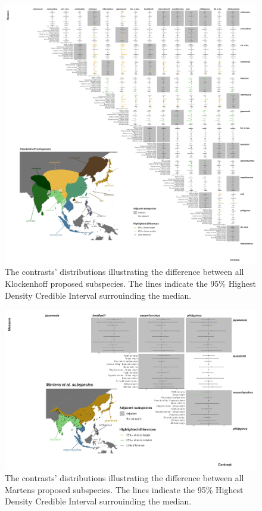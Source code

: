 \documentclass[10pt,a4paper]{article}
\begin{document}
\begin{figure}
\includegraphics[width=0.9\linewidth]{../Figures/klockSpecies_HDCI_contrasts} \caption{The contrasts' distributions illustrating the difference between all Klockenhoff proposed subspecies. The lines indicate the 95\% Highest Density Credible Interval surrouinding the median.}\label{fig:klockContrasts}
\end{figure}

\begin{figure}
\includegraphics[width=0.9\linewidth]{../Figures/martSpecies_HDCI_contrasts} \caption{The contrasts' distributions illustrating the difference between all Martens proposed subspecies. The lines indicate the 95\% Highest Density Credible Interval surrouinding the median.}\label{fig:martContrasts}
\end{figure}
\end{document}
